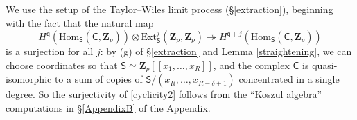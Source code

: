 \documentclass[10pt]{amsart}
\newcommand{\changecolor}{black}
\newcommand{\Z}{\mathbf{Z}}
\newcommand{\Ext}{\mathrm{Ext}}
\newcommand{\Hom}{\mathrm{Hom}}
\newcommand{\Cinf}{\mathsf{C}}
\newcommand{\Sinf}{\mathsf{S}}
\theoremstyle{remark}
\newcommand{\BWq}{\mathsf{q}}
\begin{document}
 
 \proof 
%
%
%
%
%
%
%
%
%
We use the setup of the Taylor--Wiles limit process (\S \ref{extraction}), beginning   with the fact that the natural map 
\begin{equation} \label{cyclicity2}H^{\BWq}(\Hom_{\Sinf}(\Cinf, \Z_p)) \otimes \Ext^j_{\Sinf}(\Z_p, \Z_p) \twoheadrightarrow   H^{\BWq+j}(\Hom_{\Sinf}(\Cinf, \Z_p))    \end{equation}
is a surjection for all $j$: by   (g) of \S \ref{extraction} and Lemma \ref{straightening}, 
we can choose coordinates so that $\Sinf \simeq \Z_p[[x_1, \dots, x_R]]$,
and the complex $\Cinf$ is quasi-isomorphic to {\color{\changecolor} a sum of copies of } $\Sinf/(x_{R}, \dots, x_{R-\delta+1})$
concentrated in a single degree.   So   the surjectivity of \eqref{cyclicity2} follows from the ``Koszul algebra'' computations in \S \ref{AppendixB} of the Appendix. 
\end{document}

